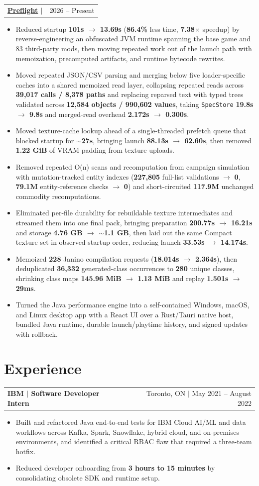 \documentclass[letterpaper,11pt]{article}
\makeatletter
\newcommand{\resumeHeadingSimple}[2]{%
  \begin{tabularx}{\textwidth}{@{}Xr@{}}
    \textbf{#1} & #2
  \end{tabularx}\vspace{-1pt}
}
\newcommand{\resumeItemListStart}{\begin{itemize}[leftmargin=0.23in,itemsep=0.4pt,parsep=0pt,topsep=0.5pt]}
\newcommand{\resumeItem}[1]{\item\fontsize{9.9pt}{11.1pt}\selectfont #1}
\newcommand{\resumeItemListEnd}{\end{itemize}\vspace{-1.25pt}}
\makeatother
\begin{document}
\resumeHeadingSimple
  {\href{https://github.com/teamleaderleo/preflight}{Preflight} $|$ \normalfont{Cross-platform performance launcher and mod analysis toolkit}}
  {2026 -- Present}
\resumeItemListStart
  \resumeItem{Reduced startup \textbf{101s $\rightarrow$ 13.69s} (\textbf{86.4\%} less time, \textbf{7.38$\times$} speedup) by reverse-engineering an obfuscated JVM runtime spanning the base game and 83 third-party mods, then moving repeated work out of the launch path with memoization, precomputed artifacts, and runtime bytecode rewrites.}
  \resumeItem{Moved repeated JSON/CSV parsing and merging below five loader-specific caches into a shared memoized read layer, collapsing repeated reads across \textbf{39,017 calls / 8,378 paths} and replacing reparsed text with typed trees validated across \textbf{12,584 objects / 990,602 values}, taking \texttt{SpecStore} \textbf{19.8s $\rightarrow$ 9.8s} and merged-read overhead \textbf{2.172s $\rightarrow$ 0.300s}.}
  \resumeItem{Moved texture-cache lookup ahead of a single-threaded prefetch queue that blocked startup for \textbf{$\sim$27s}, bringing launch \textbf{88.13s $\rightarrow$ 62.60s}, then removed \textbf{1.22 GiB} of VRAM padding from texture uploads.}
  \resumeItem{Removed repeated O(n) scans and recomputation from campaign simulation with mutation-tracked entity indexes (\textbf{227,805} full-list validations $\rightarrow$ \textbf{0}, \textbf{79.1M} entity-reference checks $\rightarrow$ \textbf{0}) and short-circuited \textbf{117.9M} unchanged commodity recomputations.}
  \resumeItem{Eliminated per-file durability for rebuildable texture intermediates and streamed them into one final pack, bringing preparation \textbf{200.77s $\rightarrow$ 16.21s} and storage \textbf{4.76 GB $\rightarrow$ $\sim$1.1 GB}, then laid out the same Compact texture set in observed startup order, reducing launch \textbf{33.53s $\rightarrow$ 14.174s}.}
  \resumeItem{Memoized \textbf{228} Janino compilation requests (\textbf{18.014s $\rightarrow$ 2.364s}), then deduplicated \textbf{36,332} generated-class occurrences to \textbf{280} unique classes, shrinking class maps \textbf{145.96 MiB $\rightarrow$ 1.13 MiB} and replay \textbf{1.501s $\rightarrow$ 29ms}.}
  \resumeItem{Turned the Java performance engine into a self-contained Windows, macOS, and Linux desktop app with a React UI over a Rust/Tauri native host, bundled Java runtime, durable launch/playtime history, and signed updates with rollback.}
\resumeItemListEnd

\section{Experience}
\resumeHeadingSimple
  {IBM $|$ Software Developer Intern}
  {Toronto, ON $|$ May 2021 -- August 2022}
\resumeItemListStart
  \resumeItem{Built and refactored Java end-to-end tests for IBM Cloud AI/ML and data workflows across Kafka, Spark, Snowflake, hybrid cloud, and on-premises environments, and identified a critical RBAC flaw that required a three-team hotfix.}
  \resumeItem{Reduced developer onboarding from \textbf{3 hours to 15 minutes} by consolidating obsolete SDK and runtime setup.}
\resumeItemListEnd
\end{document}
